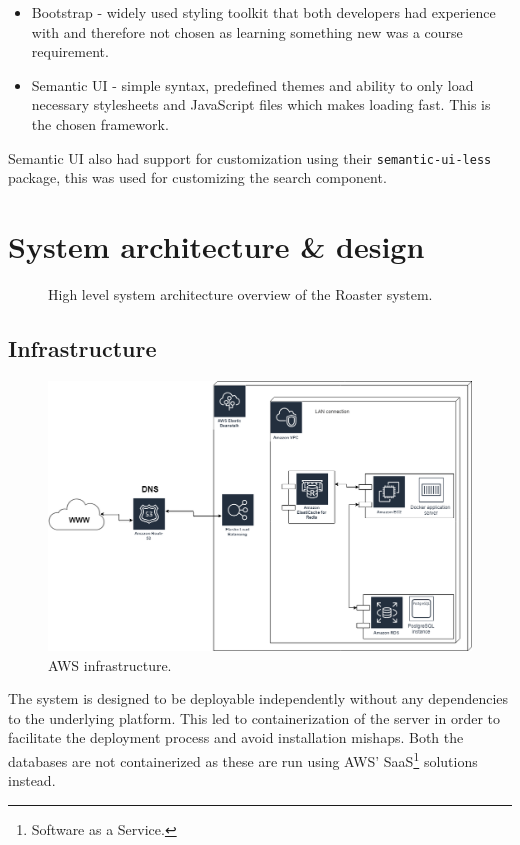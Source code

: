 \documentclass[12pt,a4paper]{report}
\begin{document}
\begin{itemize}
    \item Bootstrap - widely used styling toolkit that both developers had experience with and therefore not chosen as learning something new was a course requirement.
    \item Semantic UI - simple syntax, predefined themes and ability to only load necessary stylesheets and JavaScript files which makes loading fast. This is the chosen framework.
\end{itemize}

Semantic UI also had support for customization using their \texttt{semantic-ui-less} package, this was used for customizing the search component.

\chapter{System architecture \& design}
\begin{figure}[H]
  \centering
  
  \caption{High level system architecture overview of the Roaster system.}
\end{figure}

\section{Infrastructure}
\begin{figure}[H]
  \centering
  \includegraphics[width=16cm]{Cloud-infrastructure.png}
  \caption{AWS infrastructure.}
\end{figure}
The system is designed to be deployable independently without any dependencies to the  underlying platform. This led to containerization of the server in order to facilitate the deployment process and avoid installation mishaps. Both the databases are not containerized as these are run using AWS' SaaS\footnote{Software as a Service.} solutions instead.
\end{document}
